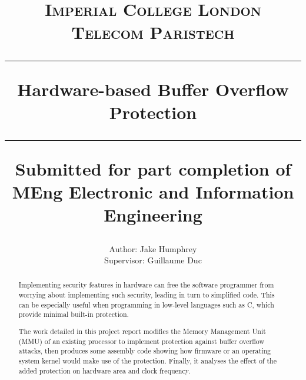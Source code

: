 \documentclass[11pt,a4paper,twoside,openany]{report}
\title{%
{\normalsize\scshape Imperial College London}\\
{\normalsize\scshape Telecom Paristech}\\
\vspace{2em}
\hrule
\vspace{1em}
{\huge\bfseries Hardware-based Buffer Overflow Protection}\\
\vspace{1em}
\hrule
\vspace{1em}
{\small Submitted for part completion of MEng Electronic and Information Engineering}
}
\author{%
Author: Jake Humphrey\\
Supervisor: Guillaume Duc
}
\date{}
\begin{document}

\pagestyle{empty}

\maketitle

\cleardoublepage
\begin{abstract}
Implementing security features in hardware can free the software programmer from worrying about implementing such security, leading in turn to simplified code. This can be especially useful when programming in low-level languages such as C, which provide minimal built-in protection.

The work detailed in this project report modifies the Memory Management Unit (MMU) of an existing processor to implement protection against buffer overflow attacks, then produces some assembly code showing how firmware or an operating system kernel would make use of the protection. Finally, it analyses the effect of the added protection on hardware area and clock frequency.

\end{abstract}

\cleardoublepage
\pagestyle{plain}
\setcounter{page}{1}
\tableofcontents

\newpage
\cleardoublepage
{}





\end{document}
